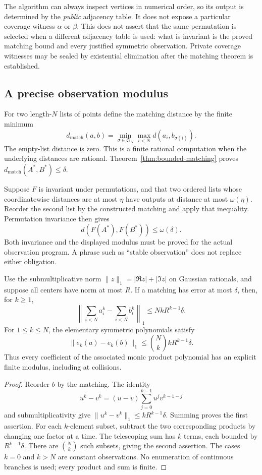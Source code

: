 The algorithm can always inspect vertices in numerical order, so its output
is determined by the \emph{public} adjacency table.  It does not expose a
particular coverage witness $\alpha$ or $\beta$.  This does not assert that
the same permutation is selected when a different adjacency table is used:
what is invariant is the proved matching bound and every justified symmetric
observation.  Private coverage witnesses may be sealed by existential
elimination after the matching theorem is established.

\subsection{A precise observation modulus}

For two length-$N$ lists of points define the matching distance by the finite
minimum
\[
 d_{\mathrm{match}}(a,b)
   =\min_{\sigma\in\mathfrak S_N}\max_{i<N}d(a_i,b_{\sigma(i)}).
\]
The empty-list distance is zero.  This is a finite rational computation when
the underlying distances are rational.  Theorem~\ref{thm:bounded-matching}
proves $d_{\mathrm{match}}(A^*,B^*)\leq\delta$.

Suppose $F$ is invariant under permutations, and that two ordered lists whose
coordinatewise distances are at most $\eta$ have outputs at distance at most
$\omega(\eta)$.  Reorder the second list by the constructed matching and
apply that inequality.  Permutation invariance then gives
\[
                      d(F(A^*),F(B^*))\leq\omega(\delta).
\]
Both invariance and the displayed modulus must be proved for the actual
observation program.  A phrase such as ``stable observation'' does not
replace either obligation.

\begin{proposition}
\label{prop:cluster-polynomial-observations}
Use the submultiplicative norm $\|z\|_1=|\Re z|+|\Im z|$ on Gaussian
rationals, and suppose all centers have norm at most $R$.  If a matching has
error at most $\delta$, then, for $k\geq1$,
\[
 \left\|\sum_{i<N}a_i^k-\sum_{i<N}b_i^k\right\|_1
      \leq NkR^{k-1}\delta.
\]
For $1\leq k\leq N$, the elementary symmetric polynomials satisfy
\[
          \|e_k(a)-e_k(b)\|_1
             \leq \binom{N}{k}kR^{k-1}\delta.
\]
Thus every coefficient of the associated monic product polynomial has an
explicit finite modulus, including at collisions.
\end{proposition}
\begin{proof}
Reorder $b$ by the matching.  The identity
\[
       u^k-v^k=(u-v)\sum_{j=0}^{k-1}u^jv^{k-1-j}
\]
and submultiplicativity give $\|u^k-v^k\|_1\leq kR^{k-1}\delta$.
Summing proves the first assertion.  For each $k$-element subset, subtract
the two corresponding products by changing one factor at a time.  The
telescoping sum has $k$ terms, each bounded by $R^{k-1}\delta$.
There are $\binom{N}{k}$ such subsets, giving the second assertion.
The cases $k=0$ and $k>N$ are constant observations.  No enumeration of
continuous branches is used; every product and sum is finite.
\end{proof}

